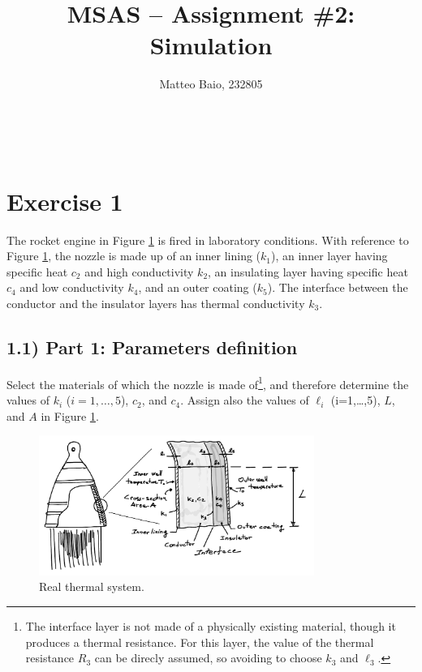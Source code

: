 \documentclass[11pt,a4paper,oneside]{article}
\title{MSAS -- Assignment \#2: Simulation}  %
\author{\large Matteo Baio, 232805}
\date{}
\makeatletter
\newcommand\headlinecolor{\normalcolor}
\renewcommand*\maketitle{
    \begingroup
    \centering
    \fontsize{14.4}{14.4}       %
    \selectfont
    \headlinecolor
    \@title\\
    \vspace{5mm}
    \@author
    \par
    \vskip1in
    \endgroup
    \vspace{-22mm}
}
\makeatother
\begin{document}
\maketitle
\thispagestyle{fancy}

\section{Exercise 1}
The rocket engine in Figure \ref{fig:therm} is fired in laboratory conditions.
With reference to Figure \ref{fig:therm}, the nozzle is made up of an inner lining ($k_1$), an inner layer having specific heat $c_2$ and high conductivity $k_2$, an insulating layer having specific heat $c_4$ and low conductivity $k_4$, and an outer coating ($k_5$).
The interface between the conductor and the insulator layers has thermal conductivity $k_3$.

\subsection*{1.1) Part 1: Parameters definition}
Select the materials of which the nozzle is made of\footnote{The interface layer is not made of a physically existing material, though it produces a thermal resistance.
For this layer, the value of the thermal resistance $R_3$ can be direcly assumed, so avoiding to choose $k_3$ and $\ell_3$.}, and therefore determine the values of $k_i$ ($i=1,\dots,5$), $c_2$, and $c_4$.
Assign also the values of $\ell_i$ (i=1,\dots,5), $L$, and $A$ in Figure \ref{fig:therm}.
\begin{figure}[ht!]
    \centering
    \includegraphics[width=0.8\textwidth]{Figures/fig_therm.pdf}
    \caption{\label{fig:therm} Real thermal system.}
\end{figure}
\end{document}
